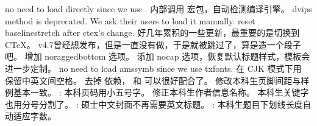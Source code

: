 {}\markdownRendererSectionBegin
{}\markdownRendererInterblockSeparator
{}\markdownRendererUlBegin
\markdownRendererUlItem no need to load  directly since we use .\markdownRendererUlItemEnd 
\markdownRendererUlItem 内部调用  宏包，自动检测编译引擎。\markdownRendererUlItemEnd 
\markdownRendererUlItem dvips method is deprecated. We ask their users to load it manually.\markdownRendererUlItemEnd 
\markdownRendererUlItem reset baselinestretch after ctex's change.\markdownRendererUlItemEnd 
\markdownRendererUlItem 好几年累积的一些更新，最重要的是切换到 CTeX。\markdownRendererUlItemEnd 
\markdownRendererUlItem v4.7曾经想发布，但是一直没有做，于是就被跳过了，算是造一个段子吧。\markdownRendererUlItemEnd 
\markdownRendererUlItem 增加 noraggedbottom 选项。\markdownRendererUlItemEnd 
\markdownRendererUlItem 添加 nocap 选项，恢复默认标题样式，模板会进一步定制。\markdownRendererUlItemEnd 
\markdownRendererUlItem no need to load amssymb since we use txfonts.\markdownRendererUlItemEnd 
\markdownRendererUlItem 在 CJK 模式下用  保留中英文间空格。\markdownRendererUlItemEnd 
\markdownRendererUlEnd \markdownRendererInterblockSeparator
{}
\markdownRendererSectionEnd 
\markdownRendererSectionEnd \markdownRendererSectionBegin
{}\markdownRendererInterblockSeparator
{}\markdownRendererSectionBegin
{}\markdownRendererInterblockSeparator
{}\markdownRendererUlBegin
\markdownRendererUlItem 去掉  依赖， 和  可以很好配合了。\markdownRendererUlItemEnd 
\markdownRendererUlItem 修改本科生页脚间距与样例基本一致。\markdownRendererUlItemEnd 
\markdownRendererUlItem {}: 本科页码用小五号字。\markdownRendererUlItemEnd 
\markdownRendererUlItem 修正本科生作者信息名称。\markdownRendererUlItemEnd 
\markdownRendererUlItem 本科生关键字也用分号分割了。\markdownRendererUlItemEnd 
\markdownRendererUlItem {}: 硕士中文封面不再需要英文标题。\markdownRendererUlItemEnd 
\markdownRendererUlItem {}: 本科生题目下划线长度自动适应字数。\markdownRendererUlItemEnd 
